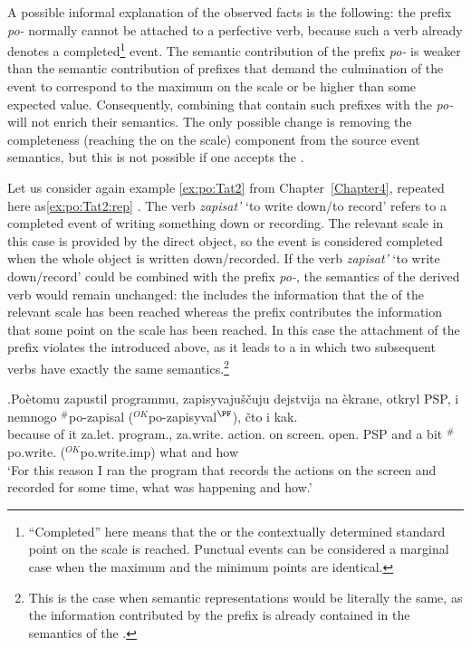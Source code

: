 A possible informal explanation of the observed facts is the following: the  prefix \textit{po-} normally cannot be attached to a perfective verb, because such a verb already denotes a completed\footnote{``Completed'' here means that the  or the contextually determined standard point on the scale is reached. Punctual events can be considered a marginal case when the maximum and the minimum points are identical.} event. The semantic contribution of the prefix \textit{po-} is weaker than the semantic contribution of prefixes that demand the culmination of the event to correspond to the maximum on the scale or be higher than some expected value. Consequently, combining  that contain such prefixes with the  \textit{po-} will not enrich their semantics. The only possible change is removing the completeness (reaching the  on the scale) component from the source event semantics, but this is not possible if one accepts the  \citep{Kiparsky:82}.

Let us consider again example \ref{ex:po:Tat2} from Chapter~\ref{Chapter4}, repeated here as\ref{ex:po:Tat2:rep} \citet{Tatevosov:09}. The verb \textit{zapisat'} `to write down/to record' refers to a completed event of writing something down or recording. The relevant scale in this case is provided by the direct object, so the event is considered completed when the whole object is written down/recorded. If the verb \textit{zapisat'} `to write down/record' could be combined with the  prefix \textit{po-}, the semantics of the derived verb would remain unchanged: the  includes the information that the  of the relevant scale has been reached whereas the prefix contributes the information that some point on the scale has been reached. In this case the attachment of the prefix violates the  introduced above, as it leads to a  in which two subsequent verbs have exactly the same semantics.\footnote{This is the case when semantic representations would be literally the same, as the information contributed by the prefix is already contained in the semantics of the .}

\exg.\label{ex:po:Tat2:rep}Po\`{e}tomu zapustil programmu, zapisyvaju\v{s}\v{c}uju dejstvija na \`{e}krane, otkryl PSP, i nemnogo $^\#$po-zapisal ($^{\textit{OK}}$po-zapisyval$^{\PF}$), \v{c}to i kak.\\
{because of it} za.let. program., za.write. action. on screen. open. PSP and {a bit} $^\#$po.write. ($^{\textit{OK}}$po.write.imp) what and how\\
\trans `For this reason I ran the program that records the actions on the screen and recorded for some time, what was happening and how.'\\ 

